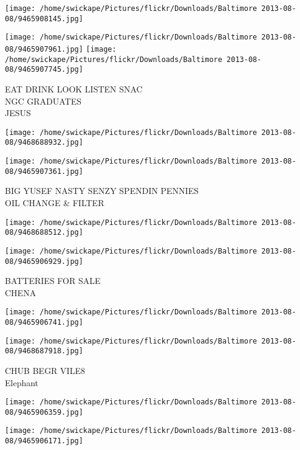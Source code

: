 \documentclass[10pt,letterpaper]{article}
\begin{document}
\texttt{[image: /home/swickape/Pictures/flickr/Downloads/Baltimore 2013-08-08/9465908145.jpg]}

\vspace{0.25in}
\texttt{[image: /home/swickape/Pictures/flickr/Downloads/Baltimore 2013-08-08/9465907961.jpg]}
\texttt{[image: /home/swickape/Pictures/flickr/Downloads/Baltimore 2013-08-08/9465907745.jpg]}

EAT DRINK LOOK LISTEN SNAC\\
NGC GRADUATES\\
JESUS\\
\pagebreak

\texttt{[image: /home/swickape/Pictures/flickr/Downloads/Baltimore 2013-08-08/9468688932.jpg]}

\vspace{0.25in}
\texttt{[image: /home/swickape/Pictures/flickr/Downloads/Baltimore 2013-08-08/9465907361.jpg]}

BIG YUSEF NASTY SENZY SPENDIN PENNIES\\
OIL CHANGE \& FILTER\\
\pagebreak

\texttt{[image: /home/swickape/Pictures/flickr/Downloads/Baltimore 2013-08-08/9468688512.jpg]}

\vspace{0.25in}
\texttt{[image: /home/swickape/Pictures/flickr/Downloads/Baltimore 2013-08-08/9465906929.jpg]}

BATTERIES FOR SALE\\
CHENA\\
\pagebreak

\texttt{[image: /home/swickape/Pictures/flickr/Downloads/Baltimore 2013-08-08/9465906741.jpg]}

\vspace{0.25in}
\texttt{[image: /home/swickape/Pictures/flickr/Downloads/Baltimore 2013-08-08/9468687918.jpg]}

CHUB BEGR VILE8\\
Elephant\\
\pagebreak

\texttt{[image: /home/swickape/Pictures/flickr/Downloads/Baltimore 2013-08-08/9465906359.jpg]}

\vspace{0.25in}
\texttt{[image: /home/swickape/Pictures/flickr/Downloads/Baltimore 2013-08-08/9465906171.jpg]}
\end{document}
